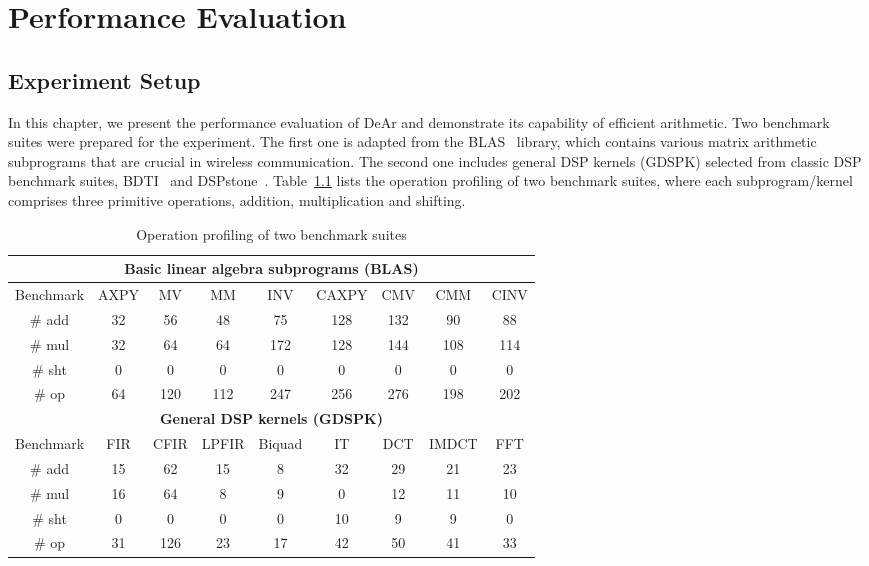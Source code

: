 \chapter{Performance Evaluation}
\section{Experiment Setup}
\label{sec:evaluation:setup}
In this chapter, we present the performance evaluation of DeAr and demonstrate its capability of efficient arithmetic.
Two benchmark suites were prepared for the experiment.
The first one is adapted from the BLAS~\cite{blas} library, 
which contains various matrix arithmetic subprograms that are crucial in wireless communication.
The second one includes general DSP kernels (GDSPK) selected from classic DSP benchmark suites, BDTI~\cite{bdti} and DSPstone~\cite{dspstone}.
Table~\ref{tab:op} lists the operation profiling of two benchmark suites, 
where each subprogram/kernel comprises three primitive operations, addition, multiplication and shifting.
\begin{table}[!ht]
    \centering
    \caption{Operation profiling of two benchmark suites}
    \label{tab:op}
    \resizebox{\columnwidth}{!}
    {
        \begin{tabular}{|c|c|c|c|c|c|c|c|c|}
            \hline
            \multicolumn{9}{|c|}{\textbf{Basic linear algebra subprograms (BLAS)}} \\ \hline
            Benchmark              & AXPY   & MV     & MM      & INV      & CAXPY  & CMV  & CMM    & CINV  \\ \hline
            \# add            &  32    &  56    &   48    &    75    &  128   & 132  &   90   &  88   \\ \hline
            \# mul            &  32    &  64    &   64    &   172    &  128   & 144  &  108   & 114   \\ \hline
            \# sht            &   0    &   0    &    0    &     0    &    0   &   0  &    0   &   0   \\ \hline
            \# op             &  64    & 120    &  112    &   247    &  256   & 276  &  198   & 202   \\ \hline
            \multicolumn{9}{|c|}{\textbf{General DSP kernels (GDSPK)}}                     \\ \hline
            Benchmark              & FIR    & CFIR   & LPFIR   & Biquad   & IT     & DCT  & IMDCT  & FFT   \\ \hline
            \# add            & 15     &  62    &   15    &    8     &  32    &  29  &   21   &  23   \\ \hline
            \# mul            & 16     &  64    &    8    &    9     &   0    &  12  &   11   &  10   \\ \hline
            \# sht            &  0     &   0    &    0    &    0     &  10    &   9  &    9   &   0   \\ \hline
            \# op             & 31     & 126    &   23    &   17     &  42    &  50  &   41   &  33   \\ \hline
        \end{tabular}
    }
\end{table}

